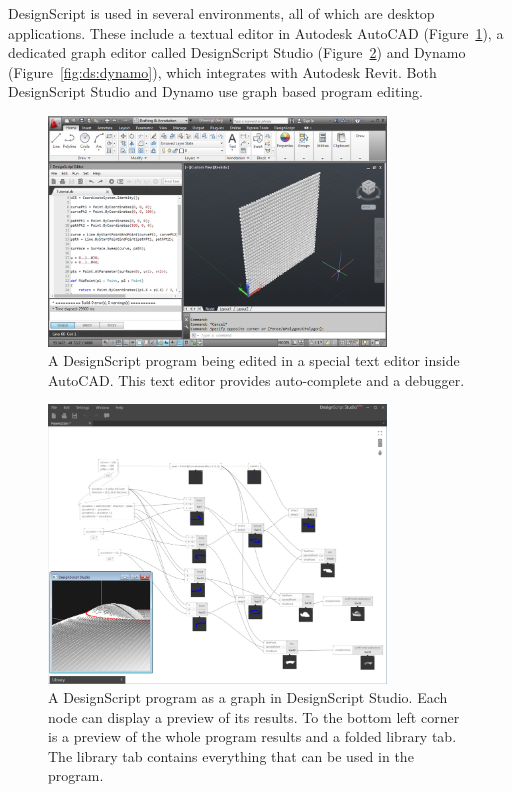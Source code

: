 DesignScript is used in several environments, all of which are desktop applications.
These include a textual editor in Autodesk AutoCAD (Figure~\ref{fig:ds:autocad}), a dedicated graph editor called DesignScript Studio (Figure~\ref{fig:ds:dsstudio}) and Dynamo (Figure~\ref{fig:ds:dynamo}), which integrates with Autodesk Revit.
Both DesignScript Studio and Dynamo use graph based program editing.

\begin{figure}
	\centering
	\includegraphics[width=0.8\textwidth]{images/ds_autocad}
	\caption[A DesignScript program being edited in a special text editor inside AutoCAD.]{A DesignScript program being edited in a special text editor inside AutoCAD. This text editor provides auto-complete and a debugger.}
	\label{fig:ds:autocad}
\end{figure}

\begin{figure}
	\centering
	\includegraphics[width=0.8\textwidth]{images/ds_dsstudio}
	\caption[A DesignScript program as a graph in DesignScript Studio.]{A DesignScript program as a graph in DesignScript Studio. Each node can display a preview of its results. To the bottom left corner is a preview of the whole program results and a folded library tab. The library tab contains everything that can be used in the program.}
	\label{fig:ds:dsstudio}
\end{figure}


